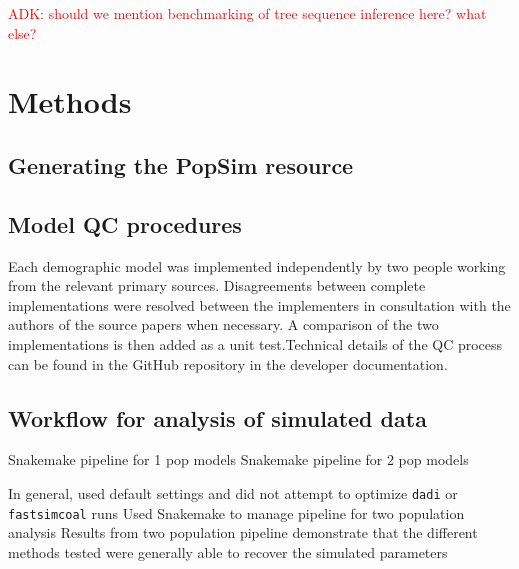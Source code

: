 \documentclass[12pt,halfline,a4paper]{ouparticle}
\newcommand{\dadi}{\texttt{dadi} }
\newcommand{\fastsimcoal}{\texttt{fastsimcoal} }
\newcommand{\adk}[1]{\textcolor{red}{ADK: #1}}
\begin{document}
\adk{should we mention benchmarking of tree sequence inference here? what else?}


\section*{Methods}
\subsection*{Generating the PopSim resource}

\subsection*{Model QC procedures}
Each demographic model was implemented independently by two people working from
the relevant primary sources. Disagreements between complete implementations
were resolved between the implementers in consultation with the authors of the
source papers when necessary. A comparison of the two implementations is then
added as a unit test.Technical details of the QC process can be found in the
GitHub repository in the developer documentation.

\subsection*{Workflow for analysis of simulated data}
Snakemake pipeline for 1 pop models
Snakemake pipeline for 2 pop models

 In general, used default
settings and did not attempt to optimize \dadi or \fastsimcoal runs Used Snakemake to
manage pipeline for two population analysis Results from two population pipeline
demonstrate that the different methods tested were generally able to recover the
simulated parameters
\end{document}
